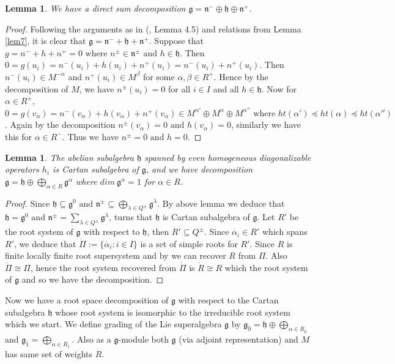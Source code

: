 \documentclass[11pt]{amsart}
\theoremstyle{plain}
\newtheorem{lemma}[thm]{Lemma}
\theoremstyle{definition}
\numberwithin{equation}{section}
\newcommand{\al}{\alpha}
\newcommand{\be}{\beta}
\newcommand{\la}{\lambda}
\newcommand{\g}{\mathfrak{g}}
\newcommand{\h}{\mathfrak{h}}
\begin{document}
	\begin{lemma}
		We have a direct sum decomposition $\g=\mathfrak{n}^-\oplus\h\oplus\mathfrak{n}^+$.
	\end{lemma}
	\begin{proof}
		Following the arguments as in (\cite{geck2017construction}, Lemma 4.5) and relations from Lemma \ref{lem7}, it is clear that $\g=\mathfrak{n}^-+\h+\mathfrak{n}^+$. Suppose that $g=n^-+h+n^+=0\text{ where }n^{\pm}\in\mathfrak{n}^{\pm}\text{ and }h\in\h$. Then $0=g(u_i)=n^-(u_i)+h(u_i)+n^+(u_i)=n^-(u_i)+n^+(u_i)$. Then $n^-(u_i)\in M^{-\al}$ and $n^+(u_i)\in M^{\be}$ for some $\al,\be\in R^+$. Hence by the decomposition of $M$, we have $n^{\pm}(u_i)=0$ for all $i\in I$ and all $h\in\h$. Now for $\al\in R^+$, $0=g(v_{\al})=n^-(v_{\al})+h(v_{\al})+n^+(v_{\al})\in M^{\al'}\oplus M^{\al}\oplus M^{\al''}\text{ where }ht(\al')\preceq ht(\al)\preceq ht(\al'')$. Again by the decomposition $n^{\pm}(v_{\al})=0\text{ and }h(v_{\al})=0$, similarly we have this for $\al\in R^-$. Thus we have $n^{\pm}=0\text{ and }h=0$.
	\end{proof}
	\begin{lemma}
		The abelian subalgebra $\h$ spanned by even homogeneous  diagonalizable operators $h_i$ is Cartan subalgebra of $\g$, and we have decomposition $\g=\h\oplus\bigoplus\limits_{\al\in R}\g^{\al}$ where $dim~\g^{\al}=1$ for $\al\in R$.
	\end{lemma}
	\begin{proof}
		Since $\h\subseteq\g^0\text{ and }\mathfrak{n}^{\pm}\subseteq\bigoplus\limits_{\la\in Q^{\pm}}\g^{\la}$. By above lemma we deduce that $\h=\g^0\text{ and }\mathfrak{n}^{\pm}=\sum\limits_{\la\in Q^{\pm}}\g^{\la}$, turns that $\h$ is Cartan subalgebra of $\g$. Let $R'$ be the root system of $\g$ with respect to $\h$, then $R'\subseteq Q^{\pm}$. Since $\dot{\al_i}\in R'$ which spans $R'$, we deduce that $\dot{\Pi}:=\{\dot{\al_i}:i\in I\}$ is a set of simple roots for $R'$. Since $R$ is finite locally finite root supersystem and by \cite{yousofzadeh2016extended} we can recover $R$ from $\Pi$. Also $\dot{\Pi}\cong\Pi$, hence the root system  recovered from $\dot{\Pi}$ is $\dot{R}\cong R$ which the root system of $\g$ and so we have the decomposition.
	\end{proof}
	Now we have a root space decomposition of $\g$ with respect to the Cartan subalgebra $\h$ whose root system is isomorphic to the irreducible root system which we start. We define grading of the Lie superalgebra $\g$ by $\g_{\bar{0}}=\h\oplus\bigoplus\limits_{\al\in R_{\bar{0}}}$ and $\g_{\bar{1}}=\bigoplus\limits_{\al\in R_{\bar{1}}}$. Also as a $\g$-module both $\g$ (via adjoint representation) and $M$ has same set of weights $R$.
\end{document}
